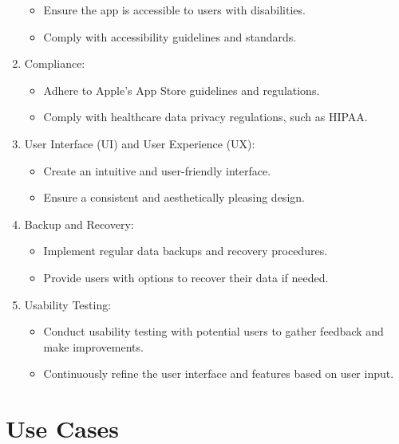 \begin{enumerate}
\begin{itemize}
            \item Ensure the app is accessible to users with disabilities.
            \item Comply with accessibility guidelines and standards.
        \end{itemize}
        \item Compliance:
        \begin{itemize}
            \item Adhere to Apple's App Store guidelines and regulations.
            \item Comply with healthcare data privacy regulations, such as HIPAA.
        \end{itemize}
        \item User Interface (UI) and User Experience (UX):
        \begin{itemize}
            \item Create an intuitive and user-friendly interface.
            \item Ensure a consistent and aesthetically pleasing design.
        \end{itemize}
        \item Backup and Recovery:
        \begin{itemize}
            \item Implement regular data backups and recovery procedures.
            \item Provide users with options to recover their data if needed.
        \end{itemize}
        \item Usability Testing:
        \begin{itemize}
            \item Conduct usability testing with potential users to gather feedback and make improvements.
            \item Continuously refine the user interface and features based on user input.
        \end{itemize}
    \end{enumerate}

\section{Use Cases}

